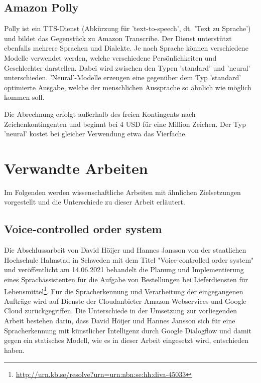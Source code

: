 \subsection{Amazon Polly}

Polly ist ein TTS-Dienst (Abkürzung für 'text-to-speech', dt. 'Text zu Sprache') und bildet das Gegenstück zu Amazon Transcribe. Der Dienst unterstützt ebenfalls mehrere Sprachen und Dialekte. Je nach Sprache können verschiedene Modelle verwendet werden, welche verschiedene Persönlichkeiten und Geschlechter darstellen. Dabei wird zwischen den Typen 'standard' und 'neural' unterschieden. 'Neural'-Modelle erzeugen eine gegenüber dem Typ 'standard' optimierte Ausgabe, welche der menschlichen Aussprache so ähnlich wie möglich kommen soll. 

Die Abrechnung erfolgt außerhalb des freien Kontingents nach Zeichenkontingenten und beginnt bei 4 USD für eine Million Zeichen. Der Typ 'neural' kostet bei gleicher Verwendung etwa das Vierfache. 

\section{Verwandte Arbeiten}

Im Folgenden werden wissenschaftliche Arbeiten mit ähnlichen Zielsetzungen vorgestellt und die Unterschiede zu dieser Arbeit erläutert.

\subsection{Voice-controlled order system}

Die Abschlussarbeit von David Höijer und Hannes Jansson von der staatlichen Hochschule Halmstad in Schweden mit dem Titel "Voice-controlled order system" und veröffentlicht am 14.06.2021 behandelt die Planung und Implementierung eines Sprachassistenten für die Aufgabe von Bestellungen bei Lieferdiensten für Lebensmittel\footnote{\url{http://urn.kb.se/resolve?urn=urn:nbn:se:hh:diva-45033}}. Für die Spracherkennung und Verarbeitung der eingegangenen Aufträge wird auf Dienste der Cloudanbieter Amazon Webservices und Google Cloud zurückgegriffen. Die Unterschiede in der Umsetzung zur vorliegenden Arbeit bestehen darin, dass David Höijer und Hannes Jansson sich für eine Spracherkennung mit künstlicher Intelligenz durch Google Dialogflow und damit gegen ein statisches Modell, wie es in dieser Arbeit eingesetzt wird, entschieden haben. 


